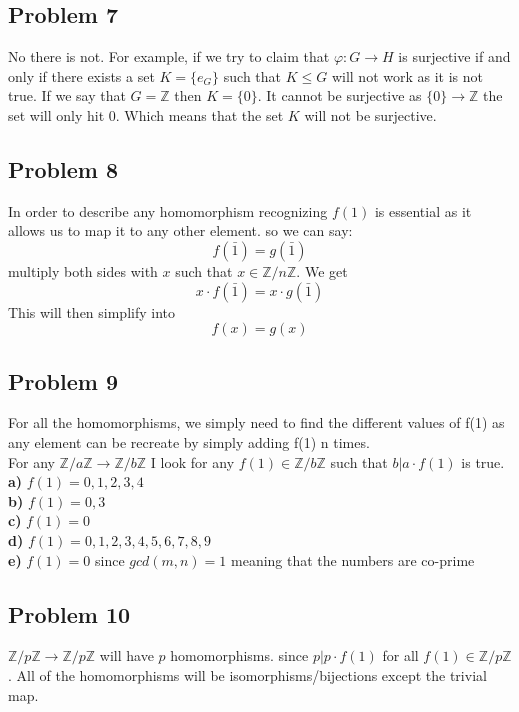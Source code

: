 \documentclass[12pt]{article}
\newcommand{\Z}{\mathbb{Z}}
\begin{document}
\subsection*{Problem 7}
No there is not. For example, if we try to claim that $\varphi : G \rightarrow H$ is surjective if and only if there exists a set $K = \{ e_G \}$ such that $K \leq G$ will not work as it is not true. If we say that $G = \Z$ then $K = \{ 0 \}$. It cannot be surjective as $\{ 0 \} \rightarrow \Z$ the set will only hit 0. Which means that the set $K$ will not be surjective.
\subsection*{Problem 8}
In order to describe any homomorphism recognizing $f(1)$ is essential as it allows us to map it to any other element. so we can say:\\
\[ f(\bar{1}) = g(\bar{1}) \]
multiply both sides with $x$ such that $x \in \Z/n\Z$. We get\\
\[ x \cdot f(\bar{1}) = x \cdot g(\bar{1}) \]
This will then simplify into\\
\[ f(x) = g(x) \]
\subsection*{Problem 9}
For all the homomorphisms, we simply need to find the different values of f(1) as any element can be recreate by simply adding f(1) n times.\\
For any $\Z /a\Z \rightarrow \Z /b\Z$ I look for any $f(1) \in \Z /b\Z$ such that $b|a\cdot f(1)$ is true.\\
\textbf{a) } $f(1) = 0,1,2,3,4$\\
\textbf{b) } $f(1) = 0,3$\\
\textbf{c) } $f(1) = 0$\\
\textbf{d) } $f(1) = 0,1,2,3,4,5,6,7,8,9$\\
\textbf{e) } $f(1) = 0$ since $gcd(m,n) = 1$ meaning that the numbers are co-prime\\

\subsection*{Problem 10}
$\Z/p\Z \rightarrow \Z/p\Z$ will have $p$ homomorphisms. since $p|p \cdot f(1)$ for all $f(1) \in \Z/p\Z$. All of the homomorphisms will be isomorphisms/bijections except the trivial map.
\end{document}
